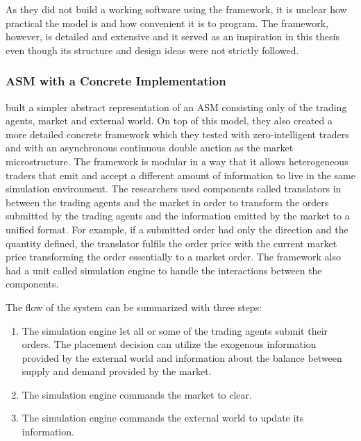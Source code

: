 
As they did not build a working software using the framework, it is unclear 
how practical the model is and how convenient it is to program. The framework, 
however, is detailed and extensive and it served as an inspiration in this thesis even though 
its structure and design ideas were not strictly followed. 


\subsubsection{ASM with a Concrete Implementation}
\citet{Julien07} built a simpler abstract representation of an ASM consisting 
only of the trading agents, market and external world. On top of this model, 
they also created a more detailed concrete framework which they tested with 
zero-intelligent traders and with an asynchronous continuous double auction as the market 
microstructure. The framework is modular in a way that it allows heterogeneous traders 
that emit and accept a different amount of information to live in the same 
simulation environment. The researchers used components called translators in between the 
trading agents and the market in order to transform the orders submitted by
the trading agents and the information emitted by the market to a unified format.
For example, if a submitted order had only the direction and the quantity 
defined, the translator fulfils the order price with the current market price 
transforming the order essentially to a market order. The framework also had a
unit called simulation engine to handle the interactions between the components.

The flow of the system can be summarized with three steps:
\begin{enumerate}
    \item The simulation engine let all or some of the trading agents submit their orders. 
            The placement decision can utilize the exogenous information provided by the 
            external world and information about the balance between supply and demand 
            provided by the market.
    \item The simulation engine commands the market to clear.
    \item The simulation engine commands the external world to update its information.
\end{enumerate}



